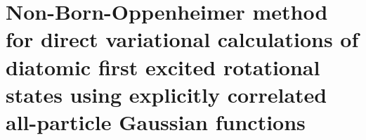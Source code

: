\chapter{Non-Born-Oppenheimer method for direct variational calculations of diatomic first excited
rotational states using explicitly correlated all-particle Gaussian functions\label{apndx11}}



